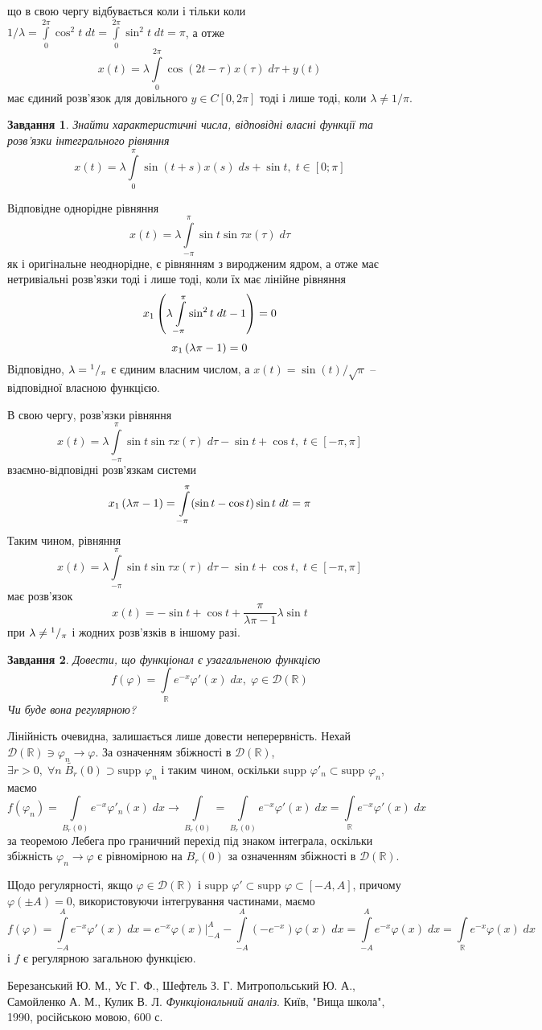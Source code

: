 \documentclass[10pt]{article}
\newtheorem{prob}{Завдання}
\newcommand{\ds}{\;ds}
\newcommand{\dt}{\;dt}
\newcommand{\dx}{\;dx}
\let\oldint\int
\renewcommand{\int}{\oldint\limits}
\let\phi\varphi
\begin{document}
		що в свою чергу відбувається коли і тільки коли $1/\lambda=\int_0^{2\pi}\cos^2t\dt=\int_0^{2\pi}\sin^2t\dt=\pi$, а отже
		\[x(t)=\lambda\int_0^{2\pi}\cos(2t-\tau)x(\tau)\;d\tau+y(t)\]
		має єдиний розв’язок для довільного $y\in C[0,2\pi]$ тоді і лише тоді, коли $\lambda\neq1/\pi$.
\begin{prob}
	Знайти характеристичні числа, відповідні власні функції та розв’язки інтегрального рівняння
	\[x(t)=\lambda\int_{0}^{\pi}\sin(t+s) x(s)\ds+\sin t,\;t\in[0;\pi]\]
\end{prob}
	Відповідне однорідне рівняння
	\[x(t)=\lambda\int_{-\pi}^{\pi}\sin t\sin\tau x(\tau)\;d\tau\]
	як і оригінальне неоднорідне, є рівнянням з виродженим ядром, а отже має нетривіальні розв’язки тоді і лише тоді, коли їх має лінійне
	рівняння
	\[x_1\mybra{\lambda\int_{-\pi}^\pi\sin^2 t\dt-1}=0\]
	\[x_1\left(\lambda\pi-1\right)=0\]
	Відповідно, $\lambda={^{1}/_{\pi}}$ є єдиним власним числом, а $x(t)=\sin(t)/\sqrt{\pi}$ -- відповідної власною функцією.

	В свою чергу, розв’язки рівняння
	\[x(t)=\lambda\int_{-\pi}^{\pi}\sin t\sin\tau x(\tau)\;d\tau-\sin t+\cos t,\;t\in[-\pi,\pi]\]
	взаємно-відповідні розв’язкам системи
	\[x_1\mybra{{\lambda}{\pi}-1}=\int_{-\pi}^\pi(\sin t-\cos t)\sin t\dt=\pi\]
	Таким чином, рівняння
	\[x(t)=\lambda\int_{-\pi}^{\pi}\sin t\sin\tau x(\tau)\;d\tau-\sin t+\cos t,\;t\in[-\pi,\pi]\]
	має розв’язок \[x(t)=-\sin t+\cos t+\frac{\pi}{\lambda\pi-1}\lambda\sin t\]
	при $\lambda\neq{^{1}/_{\pi}}$ і жодних розв’язків в іншому разі.
\begin{prob}
	Довести, що функціонал є узагальненою функцією	\[f(\phi)=\int_{\mathbb{R}}e^{-x}\phi'(x)\dx,\;\phi\in\mathcal{D}(\mathbb{R})\]
	Чи буде вона регулярною?
\end{prob}
\newcommand{\supp}{\mbox{supp }}
Лінійність очевидна, залишається лише довести неперервність. Нехай $\mathcal{D}(\mathbb{R})\ni\phi_n\to\phi$. За означенням
збіжності в $\mathcal{D}(\mathbb{R})$, $\exists r>0,\;
\forall n\;\widetilde{B_r}(0)\supset\supp\phi_n$ і таким чином, оскільки $\supp\phi'_n\subset\supp\phi_n$, маємо
\[f(\phi_n)=\int_{B_r(0)}e^{-x}\phi'_n(x)\dx\to\int_{B_r(0)}=\int_{B_r(0)}e^{-x}\phi'(x)\dx=\int_{\mathbb{R}}e^{-x}\phi'(x)\dx\]
за теоремою Лебега про граничний перехід під знаком інтеграла,
оскільки збіжність $\phi_n\to\phi$ є рівномірною на $B_r(0)$ за означенням збіжності в $\mathcal{D}(\mathbb{R})$.

Щодо регулярності, якщо $\phi\in\mathcal{D}(\mathbb{R})$ і $\supp\phi'\subset\supp\phi\subset[-A,A]$, причому $\phi(\pm A)=0$, використовуючи
інтегрування частинами, маємо
\[f(\phi)=\int_{-A}^Ae^{-x}\phi'(x)\dx=e^{-x}\phi(x)\bigg|_{-A}^A-\int_{-A}^A(-e^{-x})\phi(x)\dx=\int_{-A}^Ae^{-x}\phi(x)\dx=\int_\mathbb{R}
e^{-x}\phi(x)\dx\]
і $f$ є регулярною загальною функцією.
\begin{thebibliography}{9}
Березанський Ю. М., Ус Г. Ф., Шефтель З. Г.
Митропольський Ю. А., Самойленко А. М., Кулик В. Л.
\emph{Функціональний аналіз}.
Київ, "Вища школа"{}, 1990, російською мовою, 600 с.
\end{thebibliography}
\end{document}
